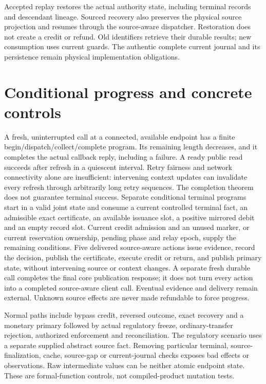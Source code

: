 \documentclass[10pt,a4paper]{article}
\begin{document}
Accepted replay restores the actual authority state, including terminal
records and descendant lineage. Sourced recovery also preserves the physical
source projection and resumes through the source-aware dispatcher. Restoration
does not create a credit or refund. Old identifiers retrieve their durable
results; new consumption uses current guards. The authentic complete current
journal and its persistence remain physical implementation obligations.

\section*{Conditional progress and concrete controls}
A fresh, uninterrupted call at a connected, available endpoint has a finite
begin/dispatch/collect/complete program. Its remaining length decreases, and
it completes the actual callback reply, including a failure. A ready public
read succeeds after refresh in a quiescent interval. Retry fairness and network
connectivity alone are insufficient: intervening context updates can invalidate
every refresh through arbitrarily long retry sequences. The completion theorem
does not guarantee terminal success. Separate conditional terminal programs
start in a valid joint state and consume a current controlled terminal fact,
an admissible exact certificate, an available issuance slot, a positive
mirrored debit and an empty record slot. Current credit admission
and an unused marker, or current reservation ownership, pending phase and
relay epoch, supply the remaining conditions. Five delivered source-aware
actions issue evidence, record the decision, publish the certificate, execute
credit or return, and publish primary state, without intervening source or
context changes. A separate fresh durable call completes the final core
publication response; it does not turn every action into a completed
source-aware client call. Eventual evidence and delivery remain external.
Unknown source effects are never made refundable to force progress.

Normal paths include bypass credit, reversed outcome, exact recovery and a
monetary primary followed by actual regulatory freeze, ordinary-transfer
rejection, authorized enforcement and reconciliation. The regulatory scenario
uses a separate supplied abstract source fact. Removing particular terminal,
source-finalization, cache, source-gap or current-journal checks exposes bad
effects or observations. Raw intermediate values can be neither atomic endpoint
state. These are formal-function controls, not compiled-product mutation tests.
\end{document}
